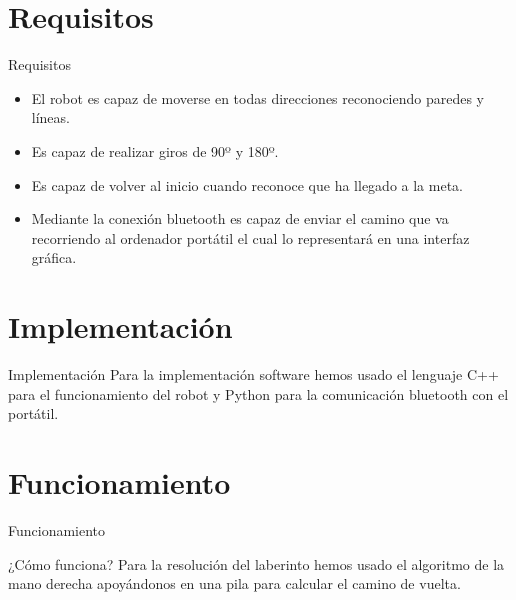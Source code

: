 \documentclass{beamer}
\begin{document}
\section{Requisitos}
\begin{frame}{Requisitos}
\begin{itemize}
	\item El robot es capaz de moverse en todas direcciones reconociendo paredes y líneas.
	\item Es capaz de realizar giros de 90º y 180º.
	\item Es capaz de volver al inicio cuando reconoce que ha llegado a la meta.
	\item Mediante la conexión bluetooth es capaz de enviar el camino que va recorriendo al ordenador portátil el cual lo representará en una interfaz gráfica.
\end{itemize}
\end{frame}



\section{Implementación}
\begin{frame}{Implementación}
	Para la implementación software hemos usado el lenguaje C++ para el funcionamiento del robot y Python para la comunicación bluetooth con el portátil.
\end{frame}

\section{Funcionamiento}
\begin{frame}{Funcionamiento}
\begin{block}{¿Cómo funciona?}
	Para la resolución del laberinto hemos usado el algoritmo de la mano derecha apoyándonos en una pila para calcular el camino de vuelta.
\end{block}	
\end{frame}
\end{document}
